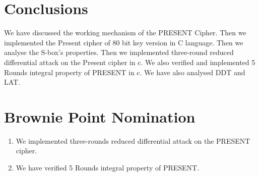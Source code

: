 \documentclass[journal=tosc,preprint]{iacrtrans}
\begin{document}
\section{Conclusions}
 We have discussed the working mechanism of the PRESENT Cipher. Then we implemented  the Present cipher of 80 bit key version in C language. Then we analyse the S-box's properties. Then we implemented three-round reduced differential attack on the Present cipher in c. We also verified and implemented 5 Rounds integral property of PRESENT in c. We have also analysed DDT and LAT.
\section{Brownie Point Nomination}
\begin{enumerate}
	\item We implemented three-rounds reduced differential attack on the PRESENT cipher. 
	\item We have verified 5 Rounds integral property of PRESENT.
\end{enumerate}
%
%
\end{document}
